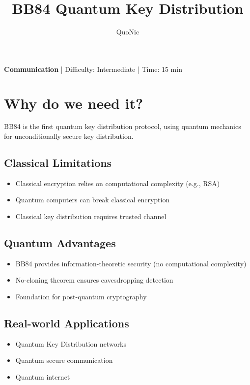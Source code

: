 \documentclass[12pt,a4paper]{article}
\title{BB84 Quantum Key Distribution}
\author{QuoNic}
\date{}
\begin{document}
\maketitle

\begin{center}
\textbf{Communication} | Difficulty: Intermediate | Time: 15 min
\end{center}

\tableofcontents
\newpage

\section{Why do we need it?}

BB84 is the first quantum key distribution protocol, using quantum mechanics for unconditionally secure key distribution.

\subsection{Classical Limitations}
\begin{itemize}
  \item Classical encryption relies on computational complexity (e.g., RSA)
  \item Quantum computers can break classical encryption
  \item Classical key distribution requires trusted channel
\end{itemize}

\subsection{Quantum Advantages}
\begin{itemize}
  \item BB84 provides information-theoretic security (no computational complexity)
  \item No-cloning theorem ensures eavesdropping detection
  \item Foundation for post-quantum cryptography
\end{itemize}

\subsection{Real-world Applications}
\begin{itemize}
  \item Quantum Key Distribution networks
  \item Quantum secure communication
  \item Quantum internet
\end{itemize}
\end{document}
